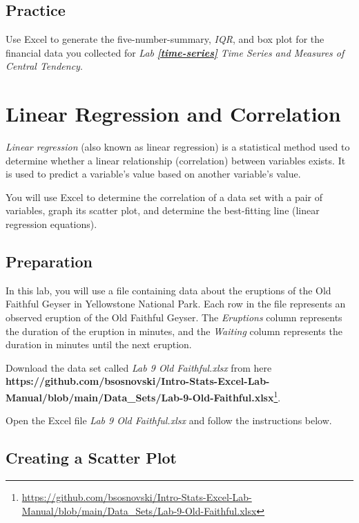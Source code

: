 \documentclass[
  12pt,
  letterpaper,
]{book}
\DeclareRobustCommand{\href}[2]{#2\footnote{\url{#1}}}
\begin{document}
\hypertarget{practice-6}{%
\section{Practice}\label{practice-6}}

Use Excel to generate the five-number-summary, \emph{IQR}, and box plot for the financial data you collected for \emph{Lab} \textbf{\emph{\ref{time-series}}} \emph{Time Series and Measures of Central Tendency}.

\hypertarget{linear-regression-and-correlation}{%
\chapter{Linear Regression and Correlation}\label{linear-regression-and-correlation}}

\emph{Linear regression} (also known as linear regression) is a statistical method used to determine whether a linear relationship (correlation) between variables exists. It is used to predict a variable's value based on another variable's value.

You will use Excel to determine the correlation of a data set with a pair of variables, graph its scatter plot, and determine the best-fitting line (linear regression equations).

\hypertarget{preparation-6}{%
\section{Preparation}\label{preparation-6}}

In this lab, you will use a file containing data about the eruptions of the Old Faithful Geyser in Yellowstone National Park. Each row in the file represents an observed eruption of the Old Faithful Geyser. The \emph{Eruptions} column represents the duration of the eruption in minutes, and the \emph{Waiting} column represents the duration in minutes until the next eruption.

Download the data set called \emph{Lab 9 Old Faithful.xlsx} from here \href{https://github.com/bsosnovski/Intro-Stats-Excel-Lab-Manual/blob/main/Data_Sets/Lab-9-Old-Faithful.xlsx}{\textbf{https://github.com/bsosnovski/Intro-Stats-Excel-Lab-Manual/blob/main/Data\_Sets/Lab-9-Old-Faithful.xlsx}}.

Open the Excel file \emph{Lab 9 Old Faithful.xlsx} and follow the instructions below.

\hypertarget{create-scatter-plot}{%
\section{Creating a Scatter Plot}\label{create-scatter-plot}}
\end{document}

